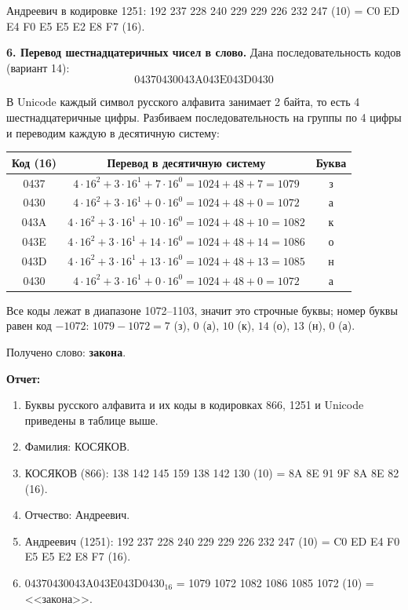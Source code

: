 \documentclass[a4paper, 12pt]{article}
\begin{document}
Андреевич в кодировке 1251: 192 237 228 240 229 229 226 232 247 (10) = C0 ED E4 F0 E5 E5 E2 E8 F7 (16).

\textbf{6. Перевод шестнадцатеричных чисел в слово.} Дана последовательность кодов (вариант 14):
$$\mathrm{04370430043A043E043D0430}$$

В Unicode каждый символ русского алфавита занимает 2 байта, то есть 4 шестнадцатеричные цифры.
Разбиваем последовательность на группы по 4 цифры и переводим каждую в десятичную систему:

\begin{center}
\begin{tabular}{|c|c|c|}
\hline
Код (16) & Перевод в десятичную систему & Буква \\ \hline
0437 & $4 \cdot 16^2 + 3 \cdot 16^1 + 7 \cdot 16^0 = 1024 + 48 + 7 = 1079$ & з \\ \hline
0430 & $4 \cdot 16^2 + 3 \cdot 16^1 + 0 \cdot 16^0 = 1024 + 48 + 0 = 1072$ & а \\ \hline
043A & $4 \cdot 16^2 + 3 \cdot 16^1 + 10 \cdot 16^0 = 1024 + 48 + 10 = 1082$ & к \\ \hline
043E & $4 \cdot 16^2 + 3 \cdot 16^1 + 14 \cdot 16^0 = 1024 + 48 + 14 = 1086$ & о \\ \hline
043D & $4 \cdot 16^2 + 3 \cdot 16^1 + 13 \cdot 16^0 = 1024 + 48 + 13 = 1085$ & н \\ \hline
0430 & $4 \cdot 16^2 + 3 \cdot 16^1 + 0 \cdot 16^0 = 1024 + 48 + 0 = 1072$ & а \\ \hline
\end{tabular}
\end{center}

Все коды лежат в диапазоне 1072--1103, значит это строчные буквы; номер буквы равен код $- 1072$:
$1079 - 1072 = 7$ (з), $0$ (а), $10$ (к), $14$ (о), $13$ (н), $0$ (а).

Получено слово: \textbf{закона}.
\vspace{1cm}

\textbf{Отчет:}
\begin{enumerate}[nosep]
    \item Буквы русского алфавита и их коды в кодировках 866, 1251 и Unicode приведены в таблице выше.
    \item Фамилия: КОСЯКОВ.
    \item КОСЯКОВ (866): 138 142 145 159 138 142 130 (10) = 8A 8E 91 9F 8A 8E 82 (16).
    \item Отчество: Андреевич.
    \item Андреевич (1251): 192 237 228 240 229 229 226 232 247 (10) = C0 ED E4 F0 E5 E5 E2 E8 F7 (16).
    \item $\mathrm{04370430043A043E043D0430}_{16}$ = 1079 1072 1082 1086 1085 1072 (10) = <<закона>>.
\end{enumerate}
\end{document}
